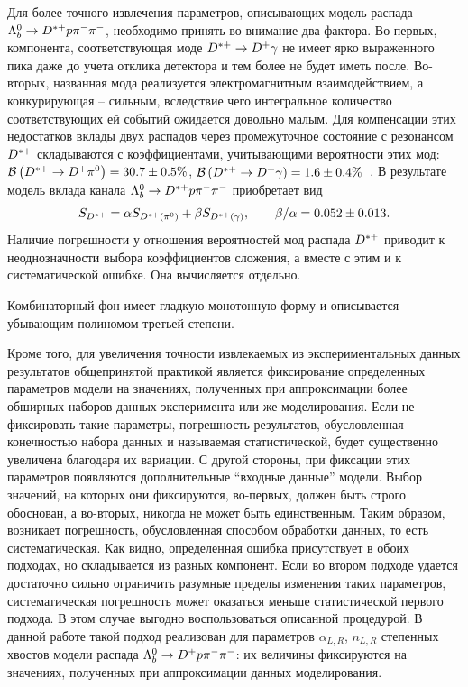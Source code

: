 Для более точного извлечения параметров, описывающих модель распада 
$\Lb\to\Dstarp\p\pim\pim$, необходимо принять во внимание два фактора. 
Во-первых, компонента, соответствующая моде $\Dstarp\to\Dp\gamma$ не 
имеет ярко выраженного пика даже до учета отклика детектора и тем более 
не будет иметь после. Во-вторых, названная мода реализуется 
электромагнитным взаимодействием, а конкурирующая -- сильным, вследствие 
чего интегральное количество соответствующих ей событий ожидается 
довольно малым. Для компенсации этих недостатков вклады двух распадов 
через промежуточное состояние с резонансом ${D^{*+}}$ складываются 
с коэффициентами, учитывающими вероятности этих мод: 
$\BR{\Dstarp\to\Dp\piz} = 30.7 \pm 0.5 \%$, $\BR{\Dstarp\to\Dp\gamma} 
= 1.6 \pm 0.4 \%$~\cite{PDG}. В результате модель вклада канала 
$\Lb\to\Dstarp\p\pim\pim$ приобретает вид
\[ S_{{D^{*+}}} = \alpha S_{{D^{*+}}({\pi^0})} + \beta S_{{D^{*+}}(\gamma)},
\qquad \beta/\alpha = 0.052 \pm 0.013.\]
Наличие погрешности у отношения вероятностей мод распада ${D^{*+}}$ 
приводит к неоднозначности выбора коэффициентов сложения, а вместе 
с этим и к систематической ошибке. Она вычисляется отдельно.

Комбинаторный фон имеет гладкую монотонную форму и описывается убывающим 
полиномом третьей степени.

Кроме того, для увеличения точности извлекаемых из экспериментальных 
данных результатов общепринятой практикой является фиксирование 
определенных параметров модели на значениях, полученных при 
аппроксимации более обширных наборов данных эксперимента или же 
моделирования. Если не фиксировать такие параметры, погрешность 
результатов, обусловленная конечностью набора данных и называемая 
статистической, будет существенно увеличена благодаря их вариации. 
С другой стороны, при фиксации этих параметров появляются дополнительные 
``входные данные'' модели. Выбор значений, на которых они фиксируются, 
во-первых, должен быть строго обоснован, а во-вторых, никогда не может 
быть единственным. Таким образом, возникает погрешность, обусловленная 
способом обработки данных, то есть систематическая. Как видно, 
определенная ошибка присутствует в обоих подходах, но складывается из 
разных компонент. Если во втором подходе удается достаточно сильно 
ограничить разумные пределы изменения таких параметров, систематическая 
погрешность может оказаться меньше статистической первого подхода. 
В этом случае выгодно воспользоваться описанной процедурой. В данной 
работе такой подход реализован для параметров $\alpha_{L,R}$, $n_{L,R}$ 
степенных хвостов модели распада $\Lb\to\Dp\p\pim\pim$: их величины 
фиксируются на значениях, полученных при аппроксимации данных 
моделирования.

